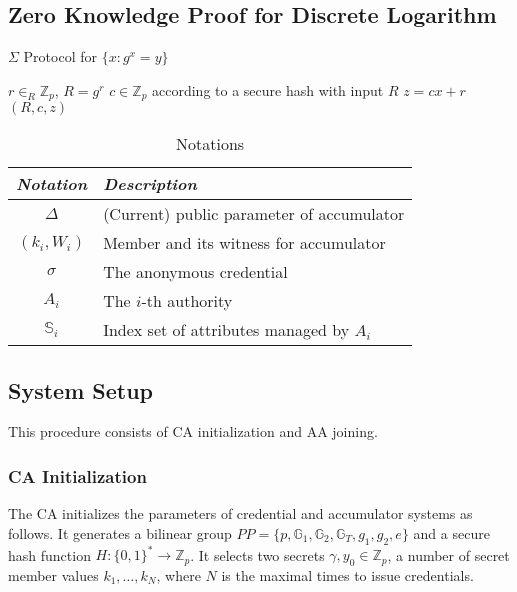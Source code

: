 \documentclass[journal]{IEEEtran}
\begin{document}
\subsection{Zero Knowledge Proof for Discrete Logarithm}

\begin{algorithm}[h]
	\caption{$\Sigma$ Protocol for $\{x: g^x = y\}$}\label{alg:dlproof}
	\begin{algorithmic}[1]
		\STATE $r\in_R\mathbb{Z}_p$, $R = g^r$ 
		\STATE $c\in \mathbb{Z}_p $ according to a secure hash with input $R$
		\STATE $z = cx + r$
		\RETURN $(R, c, z)$
	\end{algorithmic}
\end{algorithm}

	\begin{table}[h]
		\caption{Notations}
		\label{table:notate}
		\centering
		\begin{tabular}{c|l}
			\hline
			\emph{Notation} & \emph{Description}\\
			\hline
			$\Delta$ & (Current) public parameter of accumulator\\
			$(k_i, W_i)$ & Member and its witness for accumulator\\
			$\sigma$ & The anonymous credential\\
			$A_i$ & The $i$-th authority\\
			$\mathbb{S}_i$ & Index set of attributes managed by $A_i$\\
		\end{tabular}
	\end{table}
	
	
	\subsection{System Setup}
	This procedure consists of CA initialization and AA joining. 
	\subsubsection{CA Initialization}
	The CA initializes the parameters of credential and accumulator systems as follows. It generates a bilinear group $PP=\{p, \mathbb{G}_1, \mathbb{G}_2, \mathbb{G}_T, g_1, g_2, e\}$ and a secure hash function $H:\{0,1\}^*\rightarrow \mathbb{Z}_p$. It selects two secrets $\gamma, y_0\in \mathbb{Z}_p$, a number of secret member values $k_1, \dots, k_N$, where $N$ is the maximal times to issue credentials.
	
\end{document}

